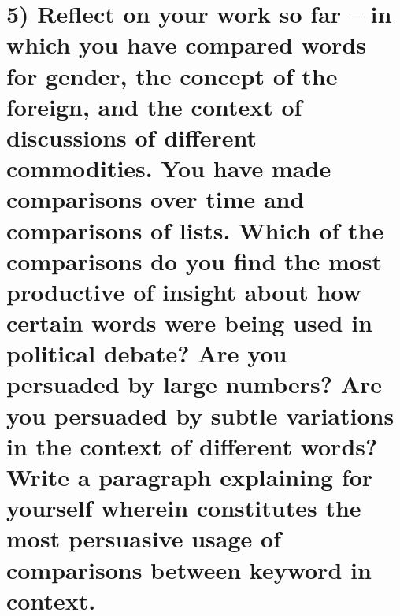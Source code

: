 \documentclass[
]{article}
\begin{document}
\section{5) Reflect on your work so far -- in which you have compared
words for gender, the concept of the foreign, and the context of
discussions of different commodities. You have made comparisons over
time and comparisons of lists. Which of the comparisons do you find the
most productive of insight about how certain words were being used in
political debate? Are you persuaded by large numbers? Are you persuaded
by subtle variations in the context of different words? Write a
paragraph explaining for yourself wherein constitutes the most
persuasive usage of comparisons between keyword in
context.}\label{reflect-on-your-work-so-far-in-which-you-have-compared-words-for-gender-the-concept-of-the-foreign-and-the-context-of-discussions-of-different-commodities.-you-have-made-comparisons-over-time-and-comparisons-of-lists.-which-of-the-comparisons-do-you-find-the-most-productive-of-insight-about-how-certain-words-were-being-used-in-political-debate-are-you-persuaded-by-large-numbers-are-you-persuaded-by-subtle-variations-in-the-context-of-different-words-write-a-paragraph-explaining-for-yourself-wherein-constitutes-the-most-persuasive-usage-of-comparisons-between-keyword-in-context.}
\end{document}

